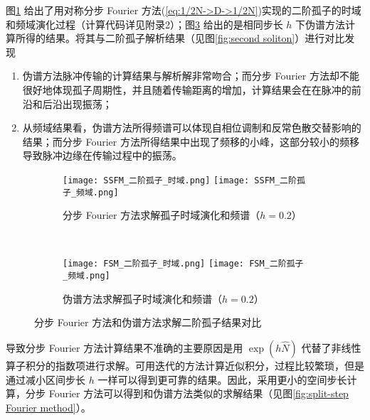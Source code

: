 图\ref{fig:SSFM_second_soliton} 给出了用对称分步 Fourier 方法(\ref{eq:1/2N->D->1/2N})实现的二阶孤子的时域和频域演化过程（计算代码详见附录2）；图\ref{fig:FSM_second_soliton} 给出的是相同步长 $h$ 下伪谱方法计算所得的结果。将其与二阶孤子解析结果（见图\ref{fig:second soliton}）进行对比发现
\begin{enumerate}[label=(\arabic*)]
    \item 伪谱方法脉冲传输的计算结果与解析解非常吻合；而分步 Fourier 方法却不能很好地体现孤子周期性，并且随着传输距离的增加，计算结果会在在脉冲的前沿和后沿出现振荡；
    \item 从频域结果看，伪谱方法所得频谱可以体现自相位调制和反常色散交替影响的结果；而分步 Fourier 方法所得结果中出现了频移的小峰，这部分较小的频移导致脉冲边缘在传输过程中的振荡。
\end{enumerate}
\begin{figure}[tbp]
    \centering
    \begin{subfigure}[t]{0.85\linewidth}
        \captionsetup{justification=centering} 
        \begin{minipage}[b]{1\linewidth}
        \texttt{[image: SSFM\_二阶孤子\_时域.png]}
        \texttt{[image: SSFM\_二阶孤子\_频域.png]}
        \caption{分步 Fourier 方法求解孤子时域演化和频谱（$h=0.2$）}
        \label{fig:SSFM_second_soliton}
        \end{minipage}
    \end{subfigure}\\
    \begin{subfigure}[t]{0.85\linewidth}
        \captionsetup{justification=centering} 
        \begin{minipage}[b]{1\linewidth}
        \texttt{[image: FSM\_二阶孤子\_时域.png]}
        \texttt{[image: FSM\_二阶孤子\_频域.png]}
        \caption{伪谱方法求解孤子时域演化和频谱（$h=0.2$）}
        \label{fig:FSM_second_soliton}
        \end{minipage}
    \end{subfigure}
    \caption{分步 Fourier 方法和伪谱方法求解二阶孤子结果对比}
\end{figure}
导致分步 Fourier 方法计算结果不准确的主要原因是用 $\exp(h\hat{N})$ 代替了非线性算子积分的指数项进行求解。可用迭代的方法计算近似积分，过程比较繁琐，但是通过减小区间步长 $h$ 一样可以得到更可靠的结果。因此，采用更小的空间步长计算，分步 Fourier 方法可以得到和伪谱方法类似的求解结果（见图\ref{fig:split-step Fourier method}）。
